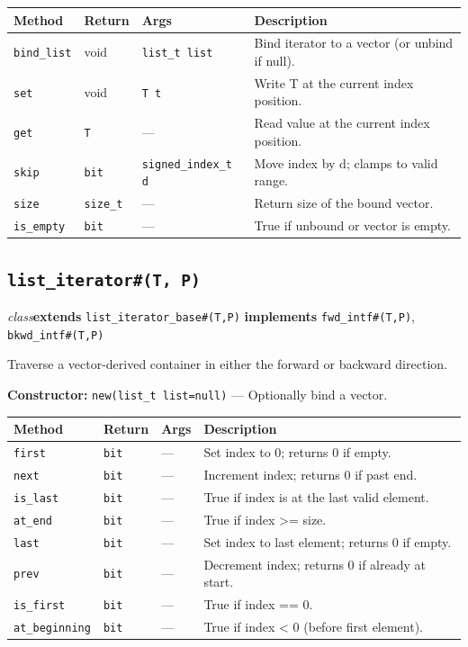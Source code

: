 \documentclass[11pt,letterpaper]{report}
\begin{document}
\begin{xltabular}{\linewidth}{>{\small}p{1.35in} >{\small}p{1.25in} >{\small}p{0.95in} >{\small}X}
\toprule
\textbf{Method} & \textbf{Return} & \textbf{Args} & \textbf{Description} \\
\midrule
\endhead
\bottomrule
\endfoot
\texttt{bind\_list} & void & \texttt{list\_t list} & Bind iterator to a vector (or unbind if null). \\
\texttt{set} & void & \texttt{T t} & Write T at the current index position. \\
\texttt{get} & \texttt{T} & --- & Read value at the current index position. \\
\texttt{skip} & \texttt{bit} & \texttt{signed\_index\_t d} & Move index by d; clamps to valid range. \\
\texttt{size} & \texttt{size\_t} & --- & Return size of the bound vector. \\
\texttt{is\_empty} & \texttt{bit} & --- & True if unbound or vector is empty. \\
\end{xltabular}

\subsection*{\texttt{list\_iterator\#(T, P)}}
\noindent\small\textit{class}\quad \textbf{extends} \texttt{list\_iterator\_base\#(T,P)} \quad \textbf{implements} \texttt{fwd\_intf\#(T,P)}, \texttt{bkwd\_intf\#(T,P)}\par

Traverse a vector-derived container in either the forward or backward direction.

\noindent\textbf{Constructor:} \texttt{new(list\_t list=null)} --- Optionally bind a vector.

\begin{xltabular}{\linewidth}{>{\small}p{1.35in} >{\small}p{1.25in} >{\small}p{0.95in} >{\small}X}
\toprule
\textbf{Method} & \textbf{Return} & \textbf{Args} & \textbf{Description} \\
\midrule
\endhead
\bottomrule
\endfoot
\texttt{first} & \texttt{bit} & --- & Set index to 0; returns 0 if empty. \\
\texttt{next} & \texttt{bit} & --- & Increment index; returns 0 if past end. \\
\texttt{is\_last} & \texttt{bit} & --- & True if index is at the last valid element. \\
\texttt{at\_end} & \texttt{bit} & --- & True if index \textgreater{}= size. \\
\texttt{last} & \texttt{bit} & --- & Set index to last element; returns 0 if empty. \\
\texttt{prev} & \texttt{bit} & --- & Decrement index; returns 0 if already at start. \\
\texttt{is\_first} & \texttt{bit} & --- & True if index == 0. \\
\texttt{at\_beginning} & \texttt{bit} & --- & True if index \textless{} 0 (before first element). \\
\end{xltabular}
\end{document}
